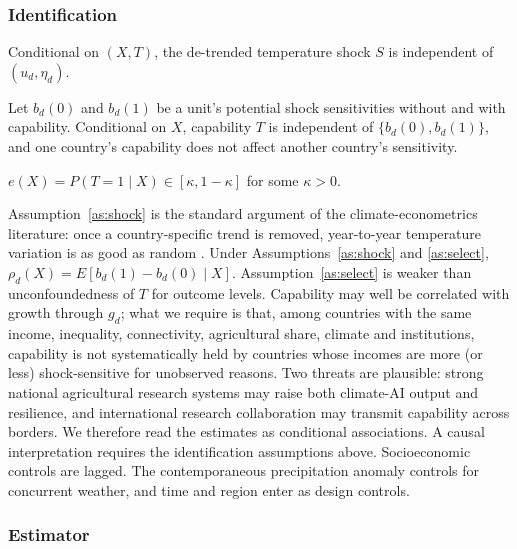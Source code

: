 \subsubsection{Identification}

\begin{assumption}\label{as:shock}
Conditional on $(X,T)$, the de-trended temperature shock $S$ is independent of $(u_d,\eta_d)$.
\end{assumption}

\begin{assumption}\label{as:select}
Let $b_d(0)$ and $b_d(1)$ be a unit's potential shock sensitivities without and with capability.
Conditional on $X$, capability $T$ is independent of
$\{b_d(0),b_d(1)\}$, and one country's capability does not affect another country's sensitivity.
\end{assumption}

\begin{assumption}[Overlap]\label{as:overlap}
$e(X)=P(T=1\mid X)\in[\kappa,1-\kappa]$ for some $\kappa>0$.
\end{assumption}

Assumption~\ref{as:shock} is the standard argument of the climate-econometrics literature: once a
country-specific trend is removed, year-to-year temperature variation is as good as random
\citep{dell2012,hsiang2016}. Under Assumptions~\ref{as:shock} and \ref{as:select},
$\rho_d(X)=E[b_d(1)-b_d(0)\mid X]$. Assumption~\ref{as:select} is weaker than unconfoundedness of
$T$ for outcome levels. Capability may well be correlated with growth through $g_d$; what we require is
that, among countries with the same income, inequality, connectivity, agricultural share, climate
and institutions, capability is not systematically held by countries whose incomes are more (or
less) shock-sensitive for unobserved reasons. Two threats are plausible: strong national
agricultural research systems may raise both climate-AI output and resilience, and international
research collaboration may transmit capability across borders. We therefore read the estimates as
conditional associations. A causal interpretation requires the identification assumptions above.
Socioeconomic controls are lagged. The contemporaneous precipitation anomaly controls for
concurrent weather, and time and region enter as design controls.

\subsubsection{Estimator}

